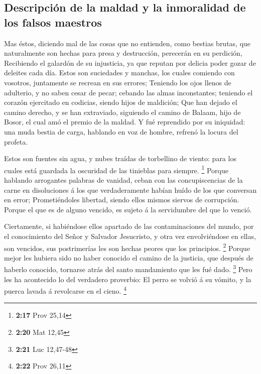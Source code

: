 \hypertarget{descripciuxf3n-de-la-maldad-y-la-inmoralidad-de-los-falsos-maestros}{%
\subsection{Descripción de la maldad y la inmoralidad de los falsos
maestros}\label{descripciuxf3n-de-la-maldad-y-la-inmoralidad-de-los-falsos-maestros}}

 Mas éstos, diciendo mal de las cosas que no entienden,
como bestias brutas, que naturalmente son hechas para presa y
destrucción, perecerán en su perdición,  Recibiendo el
galardón de su injusticia, ya que reputan por delicia poder gozar de
deleites cada día. Estos son suciedades y manchas, los cuales comiendo
con vosotros, juntamente se recrean en sus errores; 
Teniendo los ojos llenos de adulterio, y no saben cesar de pecar;
cebando las almas inconstantes; teniendo el corazón ejercitado en
codicias, siendo hijos de maldición;  Que han dejado el
camino derecho, y se han extraviado, siguiendo el camino de Balaam, hijo
de Bosor, el cual amó el premio de la maldad.  Y fué
reprendido por su iniquidad: una muda bestia de carga, hablando en voz
de hombre, refrenó la locura del profeta.

 Estos son fuentes sin agua, y nubes traídas de torbellino
de viento: para los cuales está guardada la oscuridad de las tinieblas
para siempre. \footnote{\textbf{2:17} Prov 25,14}  Porque
hablando arrogantes palabras de vanidad, ceban con las concupiscencias
de la carne en disoluciones á los que verdaderamente habían huído de los
que conversan en error;  Prometiéndoles libertad, siendo
ellos mismos siervos de corrupción. Porque el que es de alguno vencido,
es sujeto á la servidumbre del que lo venció.

 Ciertamente, si habiéndose ellos apartado de las
contaminaciones del mundo, por el conocimiento del Señor y Salvador
Jesucristo, y otra vez envolviéndose en ellas, son vencidos, sus
postrimerías les son hechas peores que los principios. \footnote{\textbf{2:20}
  Mat 12,45}  Porque mejor les hubiera sido no haber
conocido el camino de la justicia, que después de haberlo conocido,
tornarse atrás del santo mandamiento que les fué dado. \footnote{\textbf{2:21}
  Luc 12,47-48}  Pero les ha acontecido lo del verdadero
proverbio: El perro se volvió á su vómito, y la puerca lavada á
revolcarse en el cieno. \footnote{\textbf{2:22} Prov 26,11}

